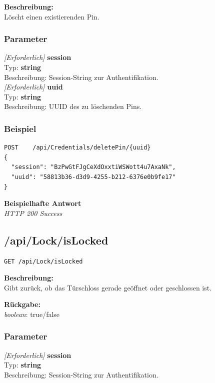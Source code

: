\textbf{Beschreibung:} \\
Löscht einen existierenden Pin.

\subsubsection{Parameter}
\textit{[Erforderlich]} \textbf{session} \\
Typ: \textbf{string} \\
Beschreibung: Session-String zur Authentifikation. \\

\textit{[Erforderlich]} \textbf{uuid} \\
Typ: \textbf{string} \\
Beschreibung: UUID des zu löschenden Pins.

\subsubsection{Beispiel}
\begin{lstlisting}
POST    /api/Credentials/deletePin/{uuid}
{
  "session": "BzPwGtFJgCeXdOxxtiWSWott4u7AxaNk",
  "uuid": "58813b36-d3d9-4255-b212-6376e0b9fe17"
}
\end{lstlisting}
\textbf{Beispielhafte Antwort} \\
\textit{HTTP 200 Success}





\subsection{/api/Lock/isLocked}
\begin{lstlisting}
GET /api/Lock/isLocked
\end{lstlisting}

\textbf{Beschreibung:} \\
Gibt zurück, ob das Türschloss gerade geöffnet oder geschlossen ist. 

\textbf{Rückgabe:} \\
\textit{boolean}: true/false

\subsubsection{Parameter}
\textit{[Erforderlich]} \textbf{session} \\
Typ: \textbf{string} \\
Beschreibung: Session-String zur Authentifikation. 

